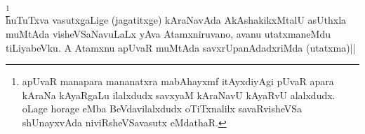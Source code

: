 
\begin{artha} 
\footnote[2]{apUvaR manapara mananatxra mabAhayxmf itAyxdiyAgi pUvaR 
apara kAraNa kAyaRgaLu ilalxdudx savxyaM kAraNavU kAyaRvU alalxdudx. 
oLage horage eMba BeVdavilalxdudx oTiTxnalilx savaRvisheVSa 
shUnayxvAda niviRsheVSavasutx eMdathaR.}\\
huTuTxva vasutxgaLige (jagatitxge) kAraNavAda AkAshakikxMtalU asUthxla 
muMtAda visheVSaNavuLaLx yAva Atamxniruvano, avanu utatxmaneMdu 
tiLiyabeVku. A Atamxnu apUvaR muMtAda savxrUpanAdadxriMda (utatxma)||
\end{artha}

\begin{artha} 

\end{artha}

\begin{artha} 

\end{artha}

\begin{artha} 

\end{artha}



